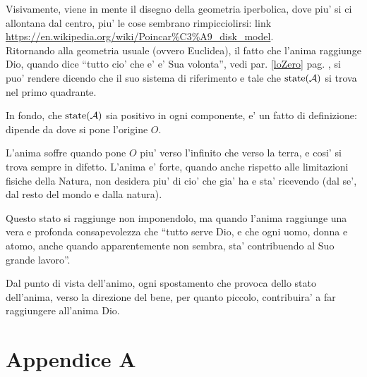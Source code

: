 Visivamente, viene in mente il disegno della geometria iperbolica, dove piu' si ci allontana dal centro, piu' le cose sembrano rimpicciolirsi: link  \url{https://en.wikipedia.org/wiki/Poincar\%C3\%A9\_disk\_model}.\\



Ritornando alla geometria usuale (ovvero Euclidea), il fatto che l'anima raggiunge Dio, quando dice ``tutto cio' che e' e' Sua volonta'', vedi par. \ref{loZero} pag. \pageref{loZero}, si puo' rendere dicendo che il suo sistema di riferimento e tale che $\textrm{state}(\mathcal{A})$ si trova nel primo quadrante. 

In fondo, che $\textrm{state}(\mathcal{A})$ sia positivo in ogni componente, e' un fatto di definizione: dipende da dove si pone l'origine $O$.

L'anima soffre quando pone $O$ piu' verso l'infinito che verso la terra, e cosi' si trova sempre in difetto. L'anima e' forte, quando anche rispetto alle limitazioni fisiche della Natura, non desidera piu' di cio' che gia' ha e sta' ricevendo (dal se', dal resto del mondo e dalla natura).

Questo stato si raggiunge non imponendolo, ma quando l'anima raggiunge una vera e profonda consapevolezza che ``tutto serve Dio, e che ogni uomo, donna e atomo, anche quando apparentemente non sembra, sta' contribuendo al Suo grande lavoro''.

Dal punto di vista dell'animo, ogni spostamento che provoca dello stato dell'anima, verso la direzione del bene, per quanto piccolo, contribuira' a far raggiungere all'anima Dio.

\section{Appendice A}
\label{menteCrea}

